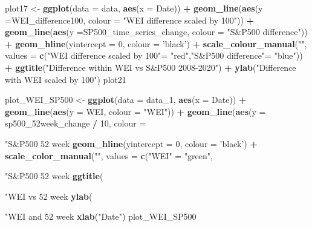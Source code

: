 \documentclass[]{article}
\newenvironment{Shaded}{\begin{snugshade}}{\end{snugshade}}
\newcommand{\KeywordTok}[1]{\textcolor[rgb]{0.13,0.29,0.53}{\textbf{#1}}}
\newcommand{\DataTypeTok}[1]{\textcolor[rgb]{0.13,0.29,0.53}{#1}}
\newcommand{\DecValTok}[1]{\textcolor[rgb]{0.00,0.00,0.81}{#1}}
\newcommand{\StringTok}[1]{\textcolor[rgb]{0.31,0.60,0.02}{#1}}
\newcommand{\OperatorTok}[1]{\textcolor[rgb]{0.81,0.36,0.00}{\textbf{#1}}}
\newcommand{\NormalTok}[1]{#1}
\begin{document}
\begin{Shaded}
\begin{Highlighting}[]
\NormalTok{plot17 <-}\StringTok{ }\KeywordTok{ggplot}\NormalTok{(}\DataTypeTok{data =}\NormalTok{ data, }\KeywordTok{aes}\NormalTok{(}\DataTypeTok{x =}\NormalTok{ Date)) }\OperatorTok{+}\StringTok{ }
\StringTok{  }\KeywordTok{geom_line}\NormalTok{(}\KeywordTok{aes}\NormalTok{(}\DataTypeTok{y =}\NormalTok{WEI_difference100, }\DataTypeTok{colour =} \StringTok{"WEI difference scaled by 100"}\NormalTok{)) }\OperatorTok{+}\StringTok{ }
\StringTok{  }\KeywordTok{geom_line}\NormalTok{(}\KeywordTok{aes}\NormalTok{(}\DataTypeTok{y =}\NormalTok{SP500_time_series_change, }\DataTypeTok{colour =} \StringTok{"S&P500 difference"}\NormalTok{)) }\OperatorTok{+}\StringTok{ }
\StringTok{  }\KeywordTok{geom_hline}\NormalTok{(}\DataTypeTok{yintercept =} \DecValTok{0}\NormalTok{, }\DataTypeTok{colour =} \StringTok{'black'}\NormalTok{) }\OperatorTok{+}\StringTok{ }
\StringTok{  }\KeywordTok{scale_colour_manual}\NormalTok{(}\StringTok{""}\NormalTok{, }\DataTypeTok{values =} 
  \KeywordTok{c}\NormalTok{(}\StringTok{"WEI difference scaled by 100"}\NormalTok{=}\StringTok{ "red"}\NormalTok{,}\StringTok{"S&P500 difference"}\NormalTok{=}\StringTok{ "blue"}\NormalTok{)) }\OperatorTok{+}
\StringTok{  }\KeywordTok{ggtitle}\NormalTok{(}\StringTok{"Difference within WEI vs S&P500 2008-2020"}\NormalTok{) }\OperatorTok{+}\StringTok{ }
\StringTok{  }\KeywordTok{ylab}\NormalTok{(}\StringTok{"Difference with WEI scaled by 100"}\NormalTok{)}
\NormalTok{plot21}

\NormalTok{plot_WEI_SP500 <-}\StringTok{ }\KeywordTok{ggplot}\NormalTok{(}\DataTypeTok{data =}\NormalTok{ data_}\DecValTok{1}\NormalTok{, }\KeywordTok{aes}\NormalTok{(}\DataTypeTok{x =}\NormalTok{ Date)) }\OperatorTok{+}
\StringTok{  }\KeywordTok{geom_line}\NormalTok{(}\KeywordTok{aes}\NormalTok{(}\DataTypeTok{y =}\NormalTok{ WEI, }\DataTypeTok{colour =} \StringTok{"WEI"}\NormalTok{)) }\OperatorTok{+}\StringTok{ }
\StringTok{  }\KeywordTok{geom_line}\NormalTok{(}\KeywordTok{aes}\NormalTok{(}\DataTypeTok{y =}\NormalTok{ sp500_52week_change }\OperatorTok{/}\StringTok{ }\DecValTok{10}\NormalTok{,}
                \DataTypeTok{colour =} \StringTok{"S&P500 52 week %change scaled by 10"}\NormalTok{)) }\OperatorTok{+}
\StringTok{  }\KeywordTok{geom_hline}\NormalTok{(}\DataTypeTok{yintercept =} \DecValTok{0}\NormalTok{, }\DataTypeTok{colour =} \StringTok{'black'}\NormalTok{) }\OperatorTok{+}
\StringTok{  }\KeywordTok{scale_color_manual}\NormalTok{(}\StringTok{""}\NormalTok{, }\DataTypeTok{values =} 
  \KeywordTok{c}\NormalTok{(}\StringTok{"WEI"}\NormalTok{ =}\StringTok{ "green"}\NormalTok{, }\StringTok{"S&P500 52 week %change scaled by 10"}\NormalTok{ =}\StringTok{ "blue"}\NormalTok{)) }\OperatorTok{+}\StringTok{ }
\StringTok{  }\KeywordTok{ggtitle}\NormalTok{(}\StringTok{"WEI vs 52 week % change of S&P500"}\NormalTok{) }\OperatorTok{+}\StringTok{ }
\StringTok{  }\KeywordTok{ylab}\NormalTok{(}\StringTok{"WEI and 52 week % change S&P500"}\NormalTok{) }\OperatorTok{+}\StringTok{ }
\StringTok{  }\KeywordTok{xlab}\NormalTok{(}\StringTok{"Date"}\NormalTok{)}
\NormalTok{plot_WEI_SP500}

}}}}
\end{Highlighting}
\end{Shaded}
\end{document}
